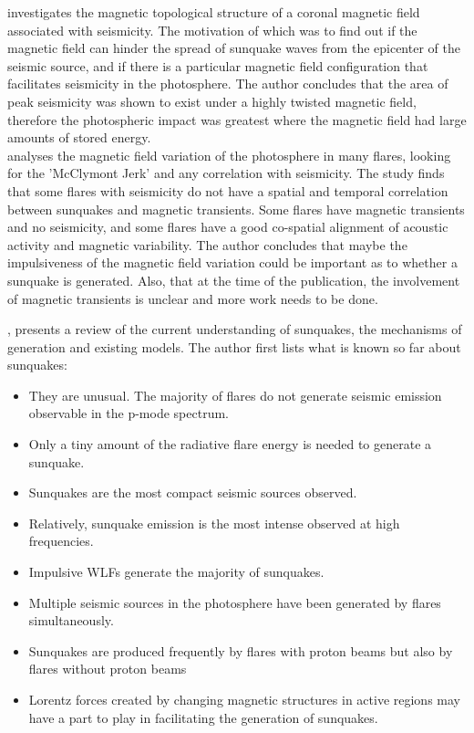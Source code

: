 \documentclass[11pt]{article}
\begin{document}
\cite{2008MNRAS.389.1905M} investigates the magnetic topological structure of a coronal magnetic field associated with seismicity. The motivation of which was to find out if the magnetic field can hinder the spread of sunquake waves from the epicenter of the seismic source, and if there is a particular magnetic field configuration that facilitates seismicity in the photosphere. The author concludes that the area of peak seismicity was shown to exist under a highly twisted magnetic field, therefore the photospheric impact was greatest where the magnetic field had large amounts of stored energy.\\   

\cite{2009MNRAS.395L..39M} analyses the magnetic field variation of the photosphere in many flares, looking for the 'McClymont Jerk' and any correlation with seismicity. The study finds that some flares with seismicity do not have a spatial and temporal correlation between sunquakes and magnetic transients. Some flares have magnetic transients and no seismicity, and some flares have a good co-spatial alignment of acoustic activity and magnetic variability. The author concludes that maybe the impulsiveness of the magnetic field variation could be important as to whether a sunquake is generated. Also, that at the time of the publication, the involvement of magnetic transients is unclear and more work needs to be done.

\cite{2011SSRv..158..451D}, presents a review of the current understanding of sunquakes, the mechanisms of generation and existing models. The author first lists what is known so far about sunquakes:

\begin{itemize}
\item They are unusual. The majority of flares do not generate seismic emission observable in the p-mode spectrum.
\item Only a tiny amount of the radiative flare energy is needed to generate a sunquake.
\item Sunquakes are the most compact seismic sources observed.
\item Relatively, sunquake emission is the most intense observed at high frequencies.
\item Impulsive WLFs generate the majority of sunquakes. 
\item Multiple seismic sources in the photosphere have been generated by flares simultaneously.
\item Sunquakes are produced frequently by flares with proton beams but also by flares without proton beams
\item Lorentz forces created by changing magnetic structures in active regions may have a part to play in facilitating the generation of sunquakes.
\end{itemize}
\end{document}
